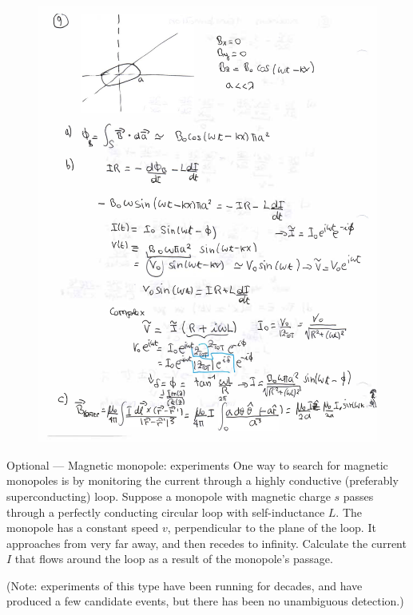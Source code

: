 \documentclass[makesolutionspdf]{esg8022pset}
\begin{document}
\begin{solution}
 \begin{figure}[H]
    \centering
    \includegraphics[width = 15cm]{antenna_sol}
\end{figure}
\end{solution}


\begin{problem}{Optional --- Magnetic monopole: experiments}
  One way to search for magnetic monopoles is by monitoring the current through a highly conductive (preferably superconducting) loop. Suppose a monopole with magnetic charge $s$ passes through a perfectly conducting circular loop with self-inductance $L$. The monopole has a constant speed $v$, perpendicular to the plane of the loop. It approaches from very far away, and then recedes to infinity. Calculate the current $I$ that flows around the loop as a result of the monopole's passage.
  
  \noindent (Note: experiments of this type have been running for decades, and have produced a few candidate events, but there has been no unambiguous detection.)
\end{problem}
\end{document}
